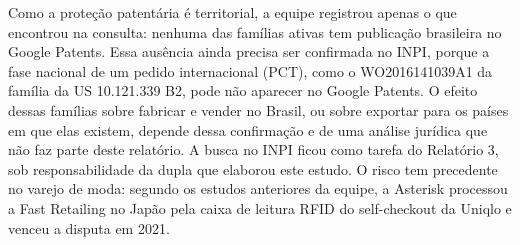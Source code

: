 Como a proteção patentária é territorial, a equipe registrou apenas o que encontrou na consulta: nenhuma das famílias ativas tem publicação brasileira no Google Patents. Essa ausência ainda precisa ser confirmada no INPI, porque a fase nacional de um pedido internacional (PCT), como o WO2016141039A1 da família da US 10.121.339 B2, pode não aparecer no Google Patents. O efeito dessas famílias sobre fabricar e vender no Brasil, ou sobre exportar para os países em que elas existem, depende dessa confirmação e de uma análise jurídica que não faz parte deste relatório. A busca no INPI ficou como tarefa do Relatório 3, sob responsabilidade da dupla que elaborou este estudo. O risco tem precedente no varejo de moda: segundo os estudos anteriores da equipe, a Asterisk processou a Fast Retailing no Japão pela caixa de leitura RFID do self-checkout da Uniqlo e venceu a disputa em 2021.
